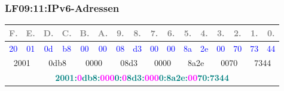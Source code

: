 

\begin{frame}[fragile]  
  \frametitle{LF09:11:IPv6-Adressen}
  \vspace{0.2cm}
  \begin{tiny}
  \begin{center}
    \renewcommand{\arraystretch}{2.4}
    \begin{tabular}{|c|c|c|c|c|c|c|c|c|c|c|c|c|c|c|c|}
    \hline
    \textcolor{gray}{\tiny{F.}} & \textcolor{gray}{\tiny{E.}} &
        \textcolor{gray}{\tiny{D.}} & \textcolor{gray}{\tiny{C.}} &
          \textcolor{gray}{\tiny{B.}} & \textcolor{gray}{\tiny{A.}} &
            \textcolor{gray}{\tiny{9.}} & \textcolor{gray}{\tiny{8.}} &
              \textcolor{gray}{\tiny{7.}} & \textcolor{gray}{\tiny{6.}} &
                \textcolor{gray}{\tiny{5.}} & \textcolor{gray}{\tiny{4.}} &
                  \textcolor{gray}{\tiny{3.}} & \textcolor{gray}{\tiny{2.}} &
                   \textcolor{gray}{\tiny{1.}} & \textcolor{gray}{\tiny{0.}} \\
    \hline
    \textcolor{blue}{\tiny{20}} & \textcolor{blue}{\tiny{01}} &
        \textcolor{blue}{\tiny{0d}} & \textcolor{blue}{\tiny{b8}} &
          \textcolor{blue}{\tiny{00}} & \textcolor{blue}{\tiny{00}} &
            \textcolor{blue}{\tiny{08}} & \textcolor{blue}{\tiny{d3}} &
              \textcolor{blue}{\tiny{00}} & \textcolor{blue}{\tiny{00}} &
                \textcolor{blue}{\tiny{8a}} & \textcolor{blue}{\tiny{2e}} &
                  \textcolor{blue}{\tiny{00}} & \textcolor{blue}{\tiny{70}} &
                   \textcolor{blue}{\tiny{73}} & \textcolor{blue}{\tiny{44}} \\
    \hline
    \multicolumn{2}{|c|}{2001} & \multicolumn{2}{c|}{0db8} &
      \multicolumn{2}{c|}{0000} & \multicolumn{2}{c|}{08d3} &
        \multicolumn{2}{c|}{0000} & \multicolumn{2}{c|}{8a2e} &
          \multicolumn{2}{c|}{0070} & \multicolumn{2}{c|}{7344} \\
    \hline
    \multicolumn{16}{|c|}{
      \textcolor{teal}{\footnotesize{\textbf{2001:\textcolor{magenta}{0}db8:\textcolor{magenta}{000}0:\textcolor{magenta}{0}8d3:\textcolor{magenta}{000}0:8a2e:\textcolor{magenta}{00}70:7344}}}} \\

\end{tabular}
\end{center}
\end{tiny}
\end{frame}
